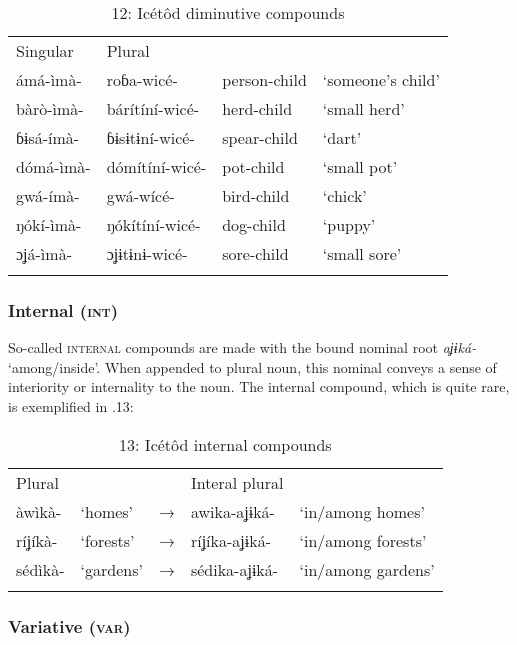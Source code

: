 \begin{table}
\caption{12: Icétôd diminutive compounds}
\label{tab:4}


\begin{tabularx}{\textwidth}{XXXX}
\lsptoprule

Singular & Plural &  & \\
ámá-ìmà- & roɓa-wicé- & person-child & ‘someone’s child’\\
bàrò-ìmà- & bárítíní-wicé- & herd-child & ‘small herd’\\
ɓɨsá-ímà- & ɓɨsɨtɨní-wicé- & spear-child & ‘dart’\\
dómá-ìmà- & dómítíní-wicé- & pot-child & ‘small pot’\\
gwá-ímà- & gwá-wícé- & bird-child & ‘chick’\\
ŋókí-ìmà- & ŋókítíní-wicé- & dog-child & ‘puppy’\\
ɔʝá-ìmà- & ɔʝɨtɨnɨ-wicé- & sore-child & ‘small sore’\\
\lspbottomrule
\end{tabularx}
\end{table}

\subsubsection{Internal (\textsc{int})}

So-called \textsc{internal} compounds are made with the bound nominal root \textit{aʝɨká- }‘among/inside’. When appended to plural noun, this nominal conveys a sense of interiority or internality to the noun. The internal compound, which is quite rare, is exemplified in .13:


\begin{table}
\caption{13: Icétôd internal compounds}
\label{tab:4}


\begin{tabularx}{\textwidth}{XXXXX}
\lsptoprule

Plural &  &  & Interal plural & \\
àwìkà- & ‘homes’ & → & awika-aʝɨká- & ‘in/among homes’\\
ríʝíkà- & ‘forests’ & → & ríʝíka-aʝɨká- & ‘in/among forests’\\
sédìkà- & ‘gardens’ & → & sédika-aʝɨká- & ‘in/among gardens’\\
\lspbottomrule
\end{tabularx}
\end{table}

\subsubsection{Variative (\textsc{var})}

